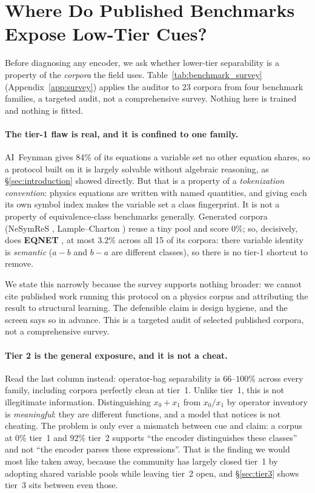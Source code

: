 \section{Where Do Published Benchmarks Expose Low-Tier Cues?}
\label{sec:survey}

Before diagnosing any encoder, we ask whether lower-tier separability is a property of the
\emph{corpora} the field uses. Table~\ref{tab:benchmark_survey} (Appendix~\ref{app:survey}) applies the auditor to 23 corpora from
four benchmark families, a targeted audit, not a comprehensive survey. Nothing here is trained and nothing is fitted.

\paragraph{The tier-1 flaw is real, and it is confined to one family.} AI~Feynman
\citep{udrescu2020ai} gives $84\%$ of its equations a variable set no other equation shares, so a
protocol built on it is largely solvable without algebraic reasoning, as \S\ref{sec:introduction}
showed directly. But that is a property of a \emph{tokenization convention}: physics equations are
written with named quantities, and giving each its own symbol index makes the variable set a class
fingerprint. It is not a property of equivalence-class benchmarks generally. Generated corpora
(NeSymReS \citep{biggio2021neural}, Lample--Charton \citep{lample2019deep}) reuse a tiny pool and
score $0\%$; so, decisively, does \textbf{EQNET} \citep{allamanis2017learning}, at most $3.2\%$
across all 15 of its corpora: there variable identity is \emph{semantic} ($a - b$ and $b - a$ are
different classes), so there is no tier-1 shortcut to remove.

We state this narrowly because the survey supports nothing broader: we cannot cite published work
running this protocol on a physics corpus and attributing the result to structural learning. The
defensible claim is design hygiene, and the screen says so in advance. This is a targeted audit of
selected published corpora, not a comprehensive survey.

\paragraph{Tier 2 is the general exposure, and it is not a cheat.} Read the last column instead:
operator-bag separability is $66$--$100\%$ across every family, including corpora perfectly clean at
tier~1. Unlike tier~1, this is not illegitimate information. Distinguishing $x_0 + x_1$ from
$x_0 / x_1$ by operator inventory is \emph{meaningful}: they are different functions, and a model
that notices is not cheating. The problem is only ever a mismatch between cue and claim: a corpus at
$0\%$ tier~1 and $92\%$ tier~2 supports ``the encoder distinguishes these classes'' and not ``the
encoder parses these expressions''. That is the finding we would most like taken away, because the
community has largely closed tier~1 by adopting shared variable pools while leaving tier~2 open,
and \S\ref{sec:tier3} shows tier~3 sits between even those.
